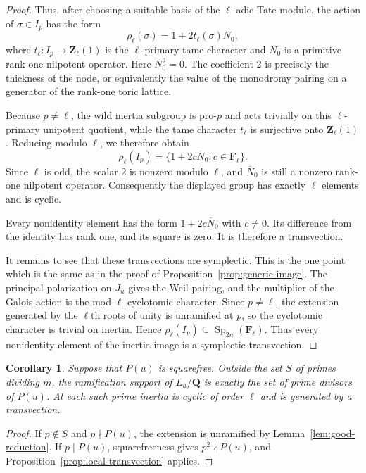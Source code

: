 \documentclass[11pt,hidelinks]{amsart}
\newtheorem{corollary}[theorem]{Corollary}
\newcommand{\Q}{\mathbf Q}
\newcommand{\Z}{\mathbf Z}
\newcommand{\F}{\mathbf F}
\newcommand{\Sp}{\operatorname{Sp}}
\begin{document}
\begin{proof}
Thus, after choosing a suitable basis of the $\ell$-adic Tate module,
the action of $\sigma\in I_p$ has the form
\[
 \rho_\ell(\sigma)=1+2t_\ell(\sigma)N_0,
\]
where $t_\ell:I_p\rightarrow\Z_\ell(1)$ is the $\ell$-primary tame
character and $N_0$ is a primitive rank-one nilpotent operator.  Here
$N_0^2=0$.  The coefficient $2$ is precisely the thickness of the
node, or equivalently the value of the monodromy pairing on a
generator of the rank-one toric lattice.

Because $p\neq\ell$, the wild inertia subgroup is pro-$p$ and acts
trivially on this $\ell$-primary unipotent quotient, while the tame
character $t_\ell$ is surjective onto $\Z_\ell(1)$.  Reducing modulo
$\ell$, we therefore obtain
\[
 \rho_\ell(I_p)
 =
 \{1+2c\overline N_0:c\in\F_\ell\}.
\]
Since $\ell$ is odd, the scalar $2$ is nonzero modulo $\ell$, and
$\overline N_0$ is still a nonzero rank-one nilpotent operator.
Consequently the displayed group has exactly $\ell$ elements and is
cyclic.

Every nonidentity element has the form
$1+2c\overline N_0$ with $c\neq0$.  Its difference from the identity
has rank one, and its square is zero.  It is therefore a
transvection.

It remains to see that these transvections are symplectic.  This is the
one point which is the same as in the proof of
Proposition~\ref{prop:generic-image}.  The principal polarization on $J_u$ gives
the Weil pairing, and the multiplier of the Galois action is the
mod-$\ell$ cyclotomic character.  Since $p\neq\ell$, the extension
generated by the $\ell$th roots of unity is unramified at $p$, so the
cyclotomic character is trivial on inertia.  Hence
$\rho_\ell(I_p)\subseteq\Sp_{2n}(\F_\ell)$.  Thus every nonidentity
element of the inertia image is a symplectic transvection.
\end{proof}



\begin{corollary}\label{cor:ram-support-linear}
Suppose that $P(u)$ is squarefree. Outside the set $S$ of primes dividing $m$, the ramification support of $L_u/\Q$ is exactly the set of prime divisors of $P(u)$. At each such prime inertia is cyclic of order $\ell$ and is generated by a transvection.
\end{corollary}

\begin{proof}
If $p\notin S$ and $p\nmid P(u)$, the extension is unramified by Lemma~\ref{lem:good-reduction}. If $p\mid P(u)$, squarefreeness gives $p^2\nmid P(u)$, and Proposition~\ref{prop:local-transvection} applies.
\end{proof}
\end{document}
